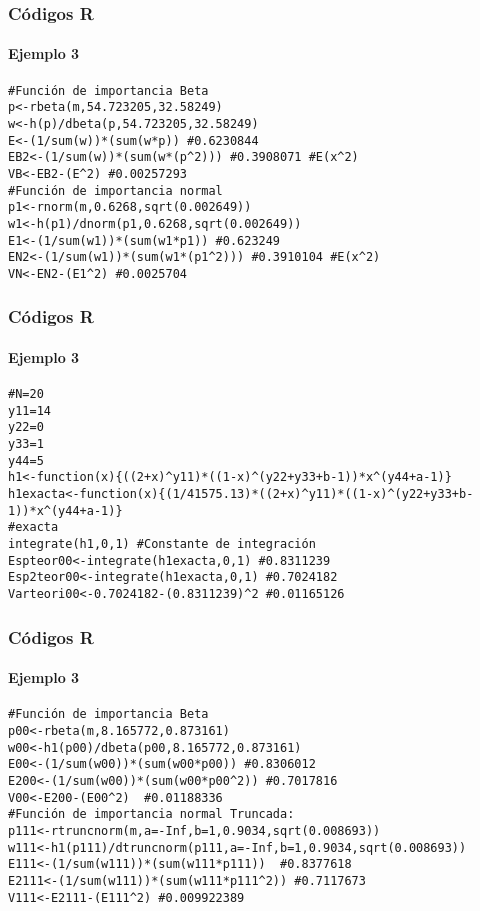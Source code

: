 \documentclass[12pt]{beamer}
\begin{document}
\begin{frame}[fragile]
\frametitle{Códigos R}
\framesubtitle{Ejemplo 3}
\begin{verbatim}
#Función de importancia Beta
p<-rbeta(m,54.723205,32.58249)
w<-h(p)/dbeta(p,54.723205,32.58249)
E<-(1/sum(w))*(sum(w*p)) #0.6230844
EB2<-(1/sum(w))*(sum(w*(p^2))) #0.3908071 #E(x^2)
VB<-EB2-(E^2) #0.00257293
#Función de importancia normal
p1<-rnorm(m,0.6268,sqrt(0.002649))
w1<-h(p1)/dnorm(p1,0.6268,sqrt(0.002649))
E1<-(1/sum(w1))*(sum(w1*p1)) #0.623249
EN2<-(1/sum(w1))*(sum(w1*(p1^2))) #0.3910104 #E(x^2)
VN<-EN2-(E1^2) #0.0025704
\end{verbatim}
\end{frame}

\begin{frame}[fragile]
\frametitle{Códigos R}
\framesubtitle{Ejemplo 3}
\begin{verbatim}
#N=20
y11=14
y22=0
y33=1
y44=5
h1<-function(x){((2+x)^y11)*((1-x)^(y22+y33+b-1))*x^(y44+a-1)}
h1exacta<-function(x){(1/41575.13)*((2+x)^y11)*((1-x)^(y22+y33+b-1))*x^(y44+a-1)}
#exacta
integrate(h1,0,1) #Constante de integración
Espteor00<-integrate(h1exacta,0,1) #0.8311239 
Esp2teor00<-integrate(h1exacta,0,1) #0.7024182
Varteori00<-0.7024182-(0.8311239)^2 #0.01165126
\end{verbatim}
\end{frame}

\begin{frame}[fragile]
\frametitle{Códigos R}
\framesubtitle{Ejemplo 3}
\begin{verbatim}
#Función de importancia Beta
p00<-rbeta(m,8.165772,0.873161)
w00<-h1(p00)/dbeta(p00,8.165772,0.873161)
E00<-(1/sum(w00))*(sum(w00*p00)) #0.8306012
E200<-(1/sum(w00))*(sum(w00*p00^2)) #0.7017816
V00<-E200-(E00^2)  #0.01188336
#Función de importancia normal Truncada:
p111<-rtruncnorm(m,a=-Inf,b=1,0.9034,sqrt(0.008693))
w111<-h1(p111)/dtruncnorm(p111,a=-Inf,b=1,0.9034,sqrt(0.008693))
E111<-(1/sum(w111))*(sum(w111*p111))  #0.8377618
E2111<-(1/sum(w111))*(sum(w111*p111^2)) #0.7117673
V111<-E2111-(E111^2) #0.009922389
\end{verbatim}
\end{frame}
\end{document}
